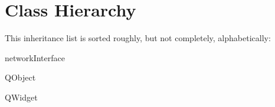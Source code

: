 \section{Class Hierarchy}
This inheritance list is sorted roughly, but not completely, alphabetically\+:\begin{DoxyCompactList}
\item network\+Interface\begin{DoxyCompactList}
\item {}
\end{DoxyCompactList}
\item Q\+Object\begin{DoxyCompactList}
\item {}
\end{DoxyCompactList}
\item Q\+Widget\begin{DoxyCompactList}
\item {}
\end{DoxyCompactList}
\item {}
\end{DoxyCompactList}
